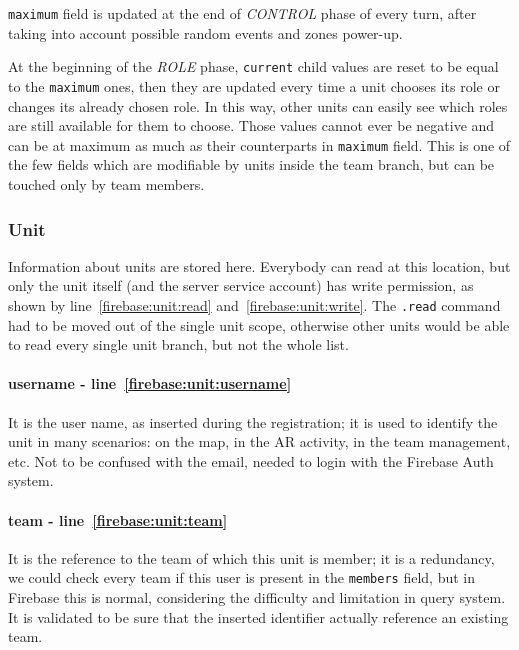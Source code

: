 				\lstinline|maximum| field is updated at the end of \emph{CONTROL} phase of every turn, after taking into account possible random events and zones power-up.
				
				At the beginning of the \emph{ROLE} phase, \lstinline|current| child values are reset to be equal to the \lstinline|maximum| ones, then they are updated every time a unit chooses its role or changes its already chosen role. In this way, other units can easily see which roles are still available for them to choose.
				Those values cannot ever be negative and can be at maximum as much as their counterparts in \lstinline|maximum| field.
				This is one of the few fields which are modifiable by units inside the team branch, but can be touched only by team members.
			
			\subsubsection{Unit}
			
				
			
				Information about units are stored here.
				Everybody can read at this location, but only the unit itself (and the server service account) has write permission, as shown by line~\ref{firebase:unit:read} and~\ref{firebase:unit:write}.
				The \lstinline|.read| command had to be moved out of the single unit scope, otherwise other units would be able to read every single unit branch, but not the whole list. \\
			
				\paragraph{username - line~\ref{firebase:unit:username}}
				It is the user name, as inserted during the registration; it is used to identify the unit in many scenarios: on the map, in the AR activity, in the team management, etc. Not to be confused with the email, needed to login with the Firebase Auth system.
			
				\paragraph{team - line~\ref{firebase:unit:team}}
				It is the reference to the team of which this unit is member; it is a redundancy, we could check every team if this user is present in the \lstinline|members| field, but in Firebase this is normal, considering the difficulty and limitation in query system.
				It is validated to be sure that the inserted identifier actually reference an existing team.
			
